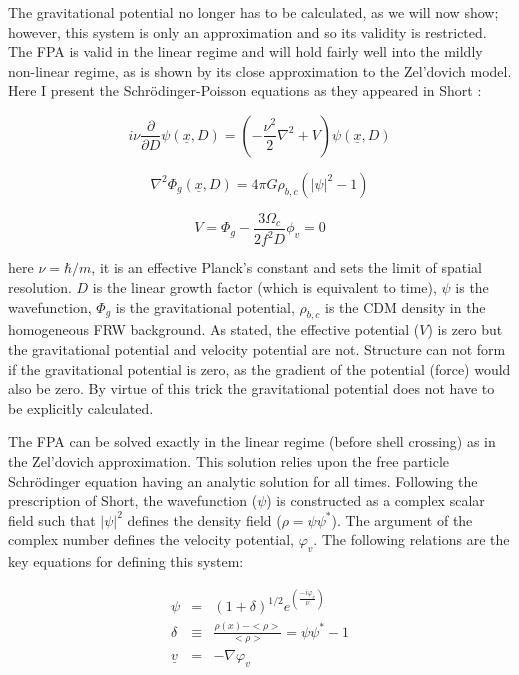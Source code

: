The gravitational potential no longer has to be calculated, as we will now show;  however, this system is only an approximation and so its validity is restricted. The FPA is valid in the linear regime and will hold fairly well into the mildly non-linear regime, as is shown by its close approximation to the Zel'dovich model. Here I present the Schr\"odinger-Poisson equations as they appeared in Short \citep{bib_short}:

\begin{equation}
\label{eqn_schfp}
 i\nu\frac{\partial}{\partial D}\psi(\underline{x},D) = (-\frac{\nu^2}{2}\nabla^2 + V) \psi(\underline{x},D)
\end{equation}

\begin{equation}
\label{eqn_poifpa}
\nabla^2\Phi_g(\underline{x},D) = 4\pi G\rho_{b,c}(|\psi|^2 -1)
\end{equation}

\begin{equation}
V = \Phi_g - \frac{3 \Omega_c}{2f^2 D}\phi_v = 0
\end{equation}

\noindent here $\nu = \hbar /m$, it is an effective Planck's constant and sets the limit of spatial resolution. $D$ is the linear growth factor (which is equivalent to time), $\psi$ is the wavefunction, $\Phi_g$ is the gravitational potential, $\rho_{b,c}$ is the CDM density in the homogeneous FRW background. As stated, the effective potential ($V$) is zero but the gravitational potential and velocity potential are not. Structure can not form if the gravitational potential is zero, as the gradient of the potential (force) would also be zero. By virtue of this trick the gravitational potential does not have to be explicitly calculated.

The FPA can be solved exactly in the linear regime (before shell crossing) as in the Zel'dovich approximation. This solution relies upon the free particle Schr\"odinger equation having an analytic solution for all times. Following the prescription of Short, the wavefunction ($\psi$) is constructed as a complex scalar field such that $|\psi|^2$ defines the density field ($\rho=\psi\psi^*$). The argument of the complex number defines the velocity potential, $\varphi_v$. The following relations are the key equations for defining this system:

\begin{eqnarray}
\label{fpa_equations}
 \psi &=& (1+ \delta)^{1/2}e^{\left(\frac{-i\varphi_v}{\nu}\right)} \nonumber \\
 \delta &\equiv& \frac{\rho(x) - <\rho>}{<\rho>} = \psi\psi^* -1  \nonumber \\
 \underline{v} &=& -\nabla \varphi_v
\end{eqnarray}

